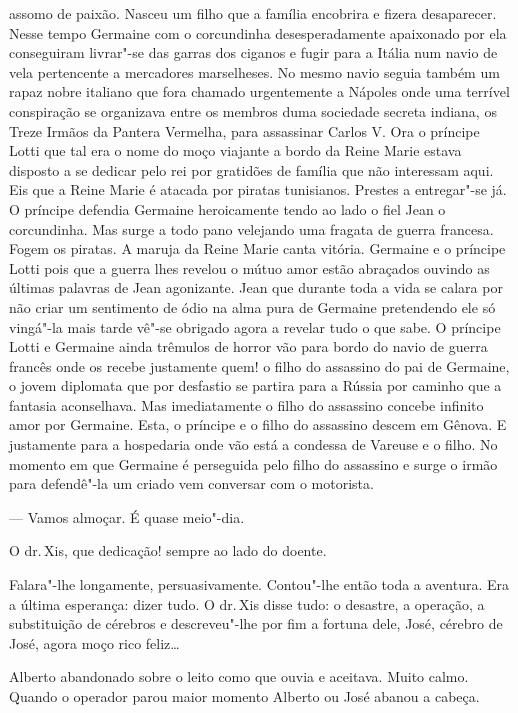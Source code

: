\begin{linenumbers}
assomo de paixão. Nasceu um filho que a família encobrira e fizera
desaparecer. Nesse tempo Germaine com o corcundinha desesperadamente
apaixonado por ela conseguiram livrar"-se das garras dos ciganos e fugir
para a Itália num navio de vela pertencente a mercadores marselheses. No
mesmo navio seguia também um rapaz nobre italiano que fora chamado
urgentemente a Nápoles onde uma terrível conspiração se organizava entre
os membros duma sociedade secreta indiana, os Treze Irmãos da Pantera
Vermelha, para assassinar Carlos V. Ora o príncipe Lotti que tal era o
nome do moço viajante a bordo da Reine Marie estava disposto a se
dedicar pelo rei por gratidões de família que não interessam aqui. Eis
que a Reine Marie é atacada por piratas tunisianos. Prestes a
entregar"-se já. O príncipe defendia Germaine heroicamente tendo ao lado
o fiel Jean o corcundinha. Mas surge a todo pano velejando uma fragata
de guerra francesa. Fogem os piratas. A maruja da Reine Marie canta
vitória. Germaine e o príncipe Lotti pois que a guerra lhes revelou o
mútuo amor estão abraçados ouvindo as últimas palavras de Jean
agonizante. Jean que durante toda a vida se calara por não criar um
sentimento de ódio na alma pura de Germaine pretendendo ele só vingá"-la
mais tarde vê"-se obrigado agora a revelar tudo o que sabe. O príncipe
Lotti e Germaine ainda trêmulos de horror vão para bordo do navio de
guerra francês onde os recebe justamente quem! o filho do assassino do
pai de Germaine, o jovem diplomata que por desfastio se partira para a
Rússia por caminho que a fantasia aconselhava. Mas imediatamente o filho
do assassino concebe infinito amor por Germaine. Esta, o príncipe e o
filho do assassino descem em Gênova. E justamente para a hospedaria onde
vão está a condessa de Vareuse e o filho. No momento em que Germaine é
perseguida pelo filho do assassino e surge o irmão para defendê"-la um
criado vem conversar com o motorista.

--- Vamos almoçar. É quase meio"-dia.

O dr.\,Xis, que dedicação! sempre ao lado do doente.

Falara"-lhe longamente, persuasivamente. Contou"-lhe então toda a
aventura. Era a última esperança: dizer tudo. O dr.\,Xis disse tudo: o
desastre, a operação, a substituição de cérebros e descreveu"-lhe por fim
a fortuna dele, José, cérebro de José, agora moço rico feliz\ldots{}

Alberto abandonado sobre o leito como que ouvia e aceitava. Muito calmo.
Quando o operador parou maior momento Alberto ou José abanou a cabeça.


\end{linenumbers}
